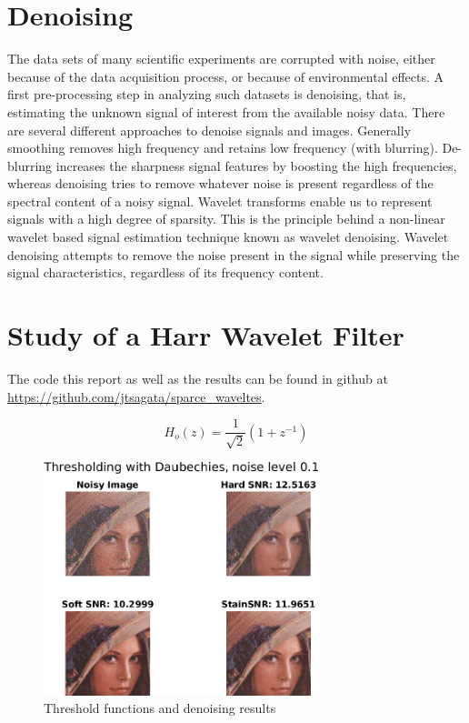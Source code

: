 \documentclass[a4paper,12pt]{article}
\begin{document}
\FloatBarrier

\section {Denoising}
The data sets of many scientific experiments are corrupted with noise, either because of the data acquisition process, or because of environmental effects. A first pre-processing step in analyzing such datasets is denoising, that is, estimating the unknown signal of interest from the available noisy data. There are several different approaches to denoise signals and images. Generally smoothing removes high frequency and retains low frequency (with blurring). De-blurring increases the sharpness signal features by boosting the high frequencies, whereas denoising tries to remove whatever noise is present regardless of the spectral content of a noisy signal. Wavelet transforms enable us to represent signals with a high degree of sparsity. This is the principle behind a non-linear wavelet based signal estimation technique known as wavelet denoising. Wavelet denoising attempts to remove the noise present in the signal while preserving the signal characteristics, regardless of its frequency content.

\section{Study of a Harr Wavelet Filter}
The code this report as well as the results can be found in  github at \url{https://github.com/jtsagata/sparce_waveltes}.

$$
H_o(z) = \frac{1}{\sqrt{2}}\left( 1 + z^{-1}\right)
$$


\begin{figure}[t]
        \centering
        \includegraphics[width=8cm]{../Results/leana_threshold.png}
        \caption{Threshold functions and denoising results}
		\label{fig:threshold}
\end{figure}
\end{document}
